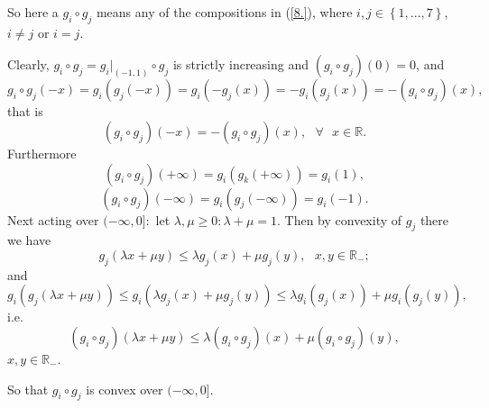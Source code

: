 \documentclass[10pt]{NSP1}
\numberwithin{equation}{section}
\begin{document}
So here a $g_{i}\circ g_{j}$ means any of the compositions in (\ref{8.}),
where $i,j\in \left \{ 1,...,7\right \} $, $i\neq j$ or $i=j.$

Clearly, $g_{i}\circ g_{j}=g_{i}|_{\left( -1,1\right) }\circ g_{j}$ is
strictly increasing and $\left( g_{i}\circ g_{j}\right) \left( 0\right) =0$,
and
\begin{equation*}
g_{i}\circ g_{j}\left( -x\right) =g_{i}\left( g_{j}\left( -x\right) \right)
=g_{i}\left( -g_{j}\left( x\right) \right) =-g_{i}\left( g_{j}\left(
x\right) \right) =-\left( g_{i}\circ g_{j}\right) \left( x\right) ,
\end{equation*}
that is
\begin{equation*}
\left( g_{i}\circ g_{j}\right) \left( -x\right) =-\left( g_{i}\circ
g_{j}\right) \left( x\right) ,\text{ \ }\forall \text{ }x\in \mathbb{R}.
\end{equation*}
Furthermore
\begin{equation*}
\left( g_{i}\circ g_{j}\right) \left( +\infty \right) =g_{i}\left(
g_{k}\left( +\infty \right) \right) =g_{i}\left( 1\right) ,
\end{equation*}
\begin{equation*}
\left( g_{i}\circ g_{j}\right) \left( -\infty \right) =g_{i}\left(
g_{j}\left( -\infty \right) \right) =g_{i}\left( -1\right) .
\end{equation*}
Next acting over $(-\infty ,0]:$ let $\lambda ,\mu \geq 0:\lambda +\mu =1$.
Then by convexity of $g_{j}$ there we have
\begin{equation*}
g_{j}\left( \lambda x+\mu y\right) \leq \lambda g_{j}\left( x\right) +\mu
g_{j}\left( y\right) ,\text{ \ }x,y\in \mathbb{R}_{-};
\end{equation*}
and
\begin{equation*}
g_{i}\left( g_{j}\left( \lambda x+\mu y\right) \right) \leq g_{i}\left(
\lambda g_{j}\left( x\right) +\mu g_{j}\left( y\right) \right) \leq \lambda
g_{i}\left( g_{j}\left( x\right) \right) +\mu g_{i}\left( g_{j}\left(
y\right) \right) ,
\end{equation*}
i.e.
\begin{equation*}
\left( g_{i}\circ g_{j}\right) \left( \lambda x+\mu y\right) \leq \lambda
\left( g_{i}\circ g_{j}\right) \left( x\right) +\mu \left( g_{i}\circ
g_{j}\right) \left( y\right) ,
\end{equation*}
$x,y\in \mathbb{R}_{-}.$

So that $g_{i}\circ g_{j}$ is convex over $(-\infty ,0].$
\end{document}

